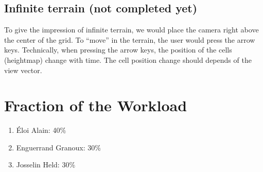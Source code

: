 \documentclass[12pt]{article}
\begin{document}
\subsection{Infinite terrain (not completed yet)}

To give the impression of infinite terrain, we would place the camera right above the center of the grid. To ``move'' in the terrain, the user would press the arrow keys. Technically, when pressing the arrow keys, the position of the cells (heightmap) change with time. The cell position change should depends of the view vector.

\section{Fraction of the Workload}


\begin{enumerate}
\item Éloi Alain: 40\%
\item Enguerrand Granoux: 30\%
\item Josselin Held: 30\%
\end{enumerate}
\end{document}

